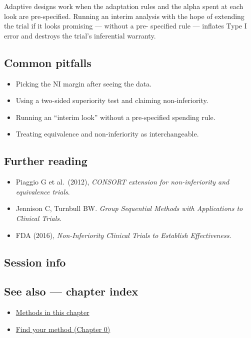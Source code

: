 \documentclass[
]{article}
\newenvironment{Shaded}{\begin{snugshade}}{\end{snugshade}}
\providecommand{\tightlist}{%
  \setlength{\itemsep}{0pt}\setlength{\parskip}{0pt}}
\begin{document}
Adaptive designs work when the adaptation rules and the alpha spent at
each look are pre-specified. Running an interim analysis with the hope
of extending the trial if it looks promising --- without a pre-
specified rule --- inflates Type I error and destroys the trial's
inferential warranty.

\subsection{Common pitfalls}\label{common-pitfalls}

\begin{itemize}
\tightlist
\item
  Picking the NI margin after seeing the data.
\item
  Using a two-sided superiority test and claiming non-inferiority.
\item
  Running an ``interim look'' without a pre-specified spending rule.
\item
  Treating equivalence and non-inferiority as interchangeable.
\end{itemize}

\subsection{Further reading}\label{further-reading}

\begin{itemize}
\tightlist
\item
  Piaggio G et al.~(2012), \emph{CONSORT extension for non-inferiority
  and equivalence trials}.
\item
  Jennison C, Turnbull BW. \emph{Group Sequential Methods with
  Applications to Clinical Trials}.
\item
  FDA (2016), \emph{Non-Inferiority Clinical Trials to Establish
  Effectiveness}.
\end{itemize}

\subsection{Session info}\label{session-info}

\begin{Shaded}
\begin{Highlighting}[]

\end{Highlighting}
\end{Shaded}

\subsection{See also --- chapter index}\label{see-also-chapter-index}

\begin{itemize}
\tightlist
\item
  \href{../index.Rmd}{Methods in this chapter}
\item
  \href{../../../ch00-find-your-method.Rmd}{Find your method (Chapter
  0)}
\end{itemize}
\end{document}
